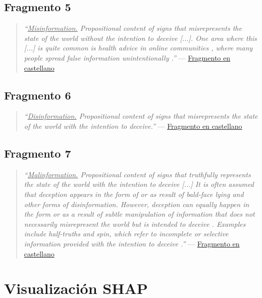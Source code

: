 \subsection{Fragmento 5}
\label{frag5eng}
\begin{quotation}
    \emph{``\underline{Misinformation.} Propositional content of signs that misrepresents the state of the world without the intention to deceive [...]. One area where this [...] is quite common is health advice in online communities \citep{Venkatesan2014}, where many people spread false information unintentionally \citep{Myers2009}.''}  --- \hyperref[frag5esp]{Fragmento en castellano}
\end{quotation}

\subsection{Fragmento 6}
\label{frag6eng}
\begin{quotation}
    \emph{``\underline{Disinformation.} Propositional content of signs that misrepresents the state of the world with the intention to deceive.''}  --- \hyperref[frag6esp]{Fragmento en castellano}
\end{quotation}

\subsection{Fragmento 7}
\label{frag7eng}
\begin{quotation}
    \emph{``\underline{Malinformation.} Propositional content of signs that truthfully represents the state of the world with the intention to deceive [...] It is often assumed that deception appears in the form of or as result of bald-face lying and other forms of disinformation. However, deception can equally happen in the form or as a result of subtle manipulation of information that does not necessarily misrepresent the world but is intended to deceive \citep{McCornack2009,McCornack2014,Wardle2018a}. Examples include half-truths and spin, which refer to incomplete or selective information provided with the intention to deceive \citep{Fallis2016}.''} --- \hyperref[frag7esp]{Fragmento en castellano}
\end{quotation}

\clearpage
\section{Visualización SHAP}


